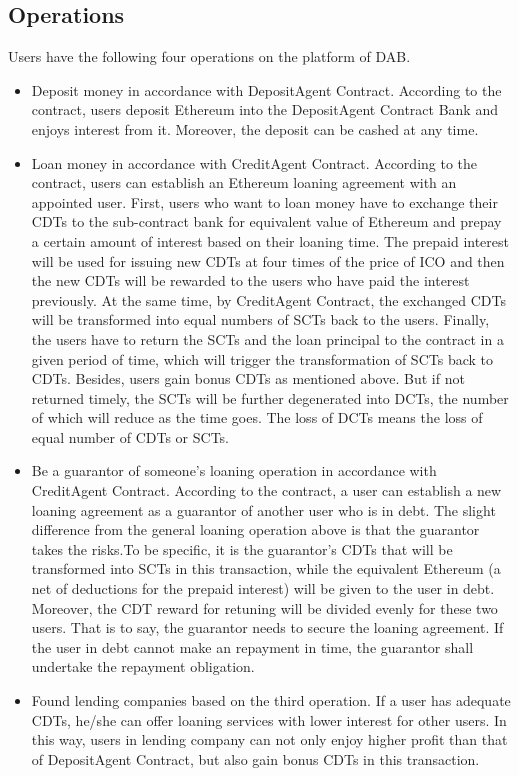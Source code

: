 \documentclass[a4paper, 10pt, conference]{ieeeconf} %
\begin{document}
\subsection{Operations}
Users have the following four operations on the platform of DAB.

\begin{itemize}
   \item Deposit money in accordance with DepositAgent Contract. According to the contract, users deposit Ethereum into the DepositAgent Contract Bank and enjoys interest from it. Moreover, the deposit can be cashed at any time.
   \item Loan money in accordance with CreditAgent Contract. According to the contract, users can establish an Ethereum loaning agreement with an appointed user. First, users who want to loan money have to exchange their CDTs to the sub-contract bank for equivalent value of Ethereum and prepay a certain amount of interest based on their loaning time. The prepaid interest will be used for issuing new CDTs at four times of the price of ICO and then the new CDTs will be rewarded to the users who have paid the interest previously. At the same time, by CreditAgent Contract, the exchanged CDTs will be transformed into equal numbers of SCTs back to the users. Finally, the users have to return the SCTs and the loan principal to the contract in a given period of time, which will trigger the  transformation of SCTs back to CDTs. Besides, users gain bonus CDTs as mentioned above. But if not returned timely,  the SCTs will be further degenerated into DCTs, the number of which will reduce as the time goes. The loss of DCTs means the loss of equal number of CDTs or SCTs.
   \item Be a guarantor of someone's loaning operation in accordance with CreditAgent Contract. According to the contract, a user can establish a new loaning agreement as a guarantor of another user who is in debt. The slight difference from the general loaning operation above is that the guarantor takes the risks.To be specific, it is the guarantor's CDTs that will be transformed into SCTs in this transaction, while the equivalent Ethereum (a net of deductions for the prepaid interest) will be given to the user in debt. Moreover, the CDT reward for retuning will be divided evenly for these two users. That is to say, the guarantor needs to secure the loaning agreement. If the user in debt cannot make an repayment in time, the guarantor shall undertake the repayment obligation.
   \item Found lending companies based on the third operation. If a user has adequate CDTs, he/she can offer loaning services with lower interest for other users. In this way, users in lending company can not only enjoy higher profit than that of DepositAgent Contract, but also gain bonus CDTs in this transaction.
\end{itemize}
\end{document}
